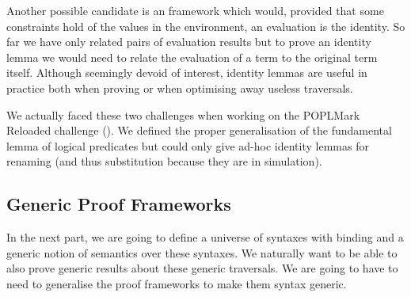 Another possible candidate is an  framework which would, provided that some
constraints hold of the values in the environment, an evaluation is the identity. So far
we have only related pairs of evaluation results but to prove an identity lemma we would
need to relate the evaluation of a term to the original term itself. Although seemingly
devoid of interest, identity lemmas are useful in practice both when proving or when
optimising away useless traversals.

We actually faced these two challenges when working on the POPLMark Reloaded challenge
(\cite{poplmark2}). We defined the proper generalisation of the fundamental lemma of
logical predicates but could only give ad-hoc identity lemmas for renaming (and thus
substitution because they are in simulation).

\subsection{Generic Proof Frameworks}

In the next part, we are going to define a universe of syntaxes with binding and a generic
notion of semantics over these syntaxes. We naturally want to be able to also prove generic
results about these generic traversals. We are going to have to need to generalise the proof
frameworks to make them syntax generic.
